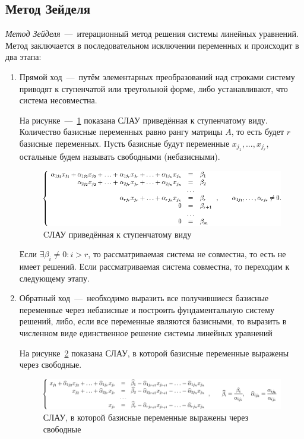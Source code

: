 \documentclass[12pt,a4paper,oneside]{extarticle}
\begin{document}
    \subsection{Метод Зейделя}
        {\it Метод Зейделя}~---~итерационный метод решения системы линейных уравнений. Метод заключается в последовательном исключении переменных и происходит в два этапа:
        \begin{enumerate}
            \item Прямой ход~---~путём элементарных преобразований над строками систему приводят к ступенчатой или треугольной форме, либо устанавливают, что система несовместна.

                На рисунке~---~\ref{pic:gaussian1} показана СЛАУ приведённая к ступенчатому виду. Количество базисные переменных равно рангу матрицы $A$, то есть будет $r$ базисные переменных. Пусть базисные будут переменные $x_{j_1}, ..., x_{j_r}$, остальные будем называть свободными (небазисными). 
                \begin{figure}[h!]
                    \centering
                    \includegraphics[scale=0.65]{gaussian1.png}
                    \caption{CЛАУ приведённая к ступенчатому виду}
                    \label{pic:gaussian1}
                \end{figure}

                Если $\exists \beta_i \neq 0 \colon i>r$, то рассматриваемая система не совместна, то есть не имеет решений. Если рассматриваемая система совместна, то переходим к следующему этапу.

            \item Обратный ход~---~необходимо выразить все получившиеся базисные переменные через небазисные и построить фундаментальную систему решений, либо, если все переменные являются базисными, то выразить в численном виде единственное решение системы линейных уравнений

                На рисунке~\ref{pic:gaussian2} показана СЛАУ, в которой базисные переменные выражены через свободные.
                \begin{figure}[h!]
                    \centering
                    \includegraphics[scale=0.45]{gaussian2.png}
                    \caption{СЛАУ, в которой базисные переменные выражены через свободные}
                    \label{pic:gaussian2}
                \end{figure}


\end{enumerate}
\end{document}
